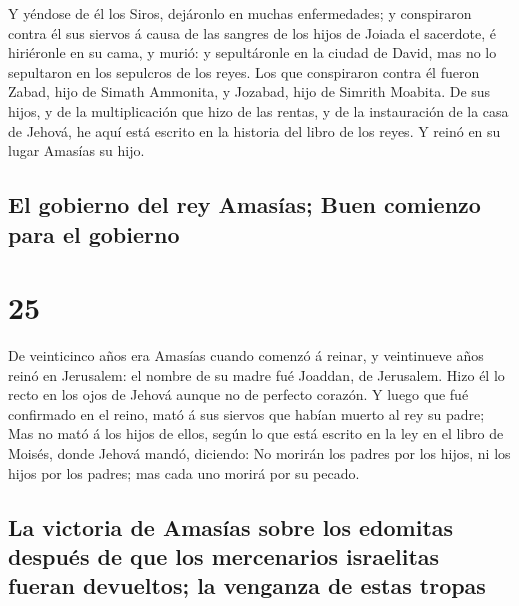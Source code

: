 Y yéndose de él los Siros, dejáronlo en muchas
enfermedades; y conspiraron contra él sus siervos á causa de las sangres
de los hijos de Joiada el sacerdote, é hiriéronle en su cama, y murió: y
sepultáronle en la ciudad de David, mas no lo sepultaron en los
sepulcros de los reyes.  Los que conspiraron contra él
fueron Zabad, hijo de Simath Ammonita, y Jozabad, hijo de Simrith
Moabita.  De sus hijos, y de la multiplicación que hizo de
las rentas, y de la instauración de la casa de Jehová, he aquí está
escrito en la historia del libro de los reyes. Y reinó en su lugar
Amasías su hijo.

\hypertarget{el-gobierno-del-rey-amasuxedas-buen-comienzo-para-el-gobierno}{%
\subsection{El gobierno del rey Amasías; Buen comienzo para el
gobierno}\label{el-gobierno-del-rey-amasuxedas-buen-comienzo-para-el-gobierno}}

\hypertarget{section-24}{%
\section{25}\label{section-24}}

 De veinticinco años era Amasías cuando comenzó á reinar, y
veintinueve años reinó en Jerusalem: el nombre de su madre fué Joaddan,
de Jerusalem.  Hizo él lo recto en los ojos de Jehová aunque
no de perfecto corazón.  Y luego que fué confirmado en el
reino, mató á sus siervos que habían muerto al rey su padre;
 Mas no mató á los hijos de ellos, según lo que está escrito
en la ley en el libro de Moisés, donde Jehová mandó, diciendo: No
morirán los padres por los hijos, ni los hijos por los padres; mas cada
uno morirá por su pecado.

\hypertarget{la-victoria-de-amasuxedas-sobre-los-edomitas-despuuxe9s-de-que-los-mercenarios-israelitas-fueran-devueltos-la-venganza-de-estas-tropas}{%
\subsection{La victoria de Amasías sobre los edomitas después de que los
mercenarios israelitas fueran devueltos; la venganza de estas
tropas}\label{la-victoria-de-amasuxedas-sobre-los-edomitas-despuuxe9s-de-que-los-mercenarios-israelitas-fueran-devueltos-la-venganza-de-estas-tropas}}

